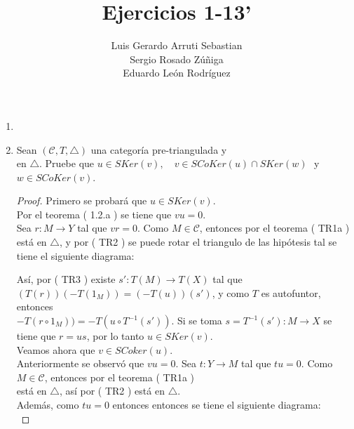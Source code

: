 \documentclass{article}
\title{Ejercicios 1-13'}
\author{Luis Gerardo Arruti Sebastian\\ Sergio Rosado Zúñiga\\ Eduardo Le\'on Rodr\'iguez}
\date{}
\begin{document}
	\maketitle
\begin{enumerate}

\item
\item Sean $(\mathscr{C},T,\triangle)$ una categoría pre-triangulada y  \\en $\triangle$.
Pruebe que $u\in SKer (v),\quad  v\in SCoKer(u)\cap SKer(w)$\,\, y \\ $w\in SCoKer(v)$.
\begin{proof}
Primero se probará que $u\in SKer (v)$. \\Por el teorema ( 1.2.a ) se tiene que $vu=0$.\\

Sea $r:M\to Y$ tal que $vr=0$. Como $M\in \mathscr{C}$, entonces por el teorema ( TR1a )  está en 
$\triangle$, y por ( TR2 ) se puede rotar el triangulo de las hipótesis tal se tiene el siguiente diagrama:\\

\centerline{
}

Así, por ( TR3 ) existe $s':T(M)\to T(X)$ tal que \\ $(T(r))(-T(1_M))=(-T(u))(s')$, y como $T$ es autofuntor, entonces \\
$-T(r\circ 1_M))=-T(u\circ T^{-1}(s'))$. Si se toma $s= T^{-1}(s'):M\to X$  se tiene que $r=us$, por lo tanto $u\in SKer(v)$.\\

Veamos ahora que $v\in SCoker(u)$.\\

Anteriormente se observó que $vu=0$. Sea $t:Y\to M$ tal que $tu=0$. Como $M\in \mathscr{C}$, entonces 
por el teorema ( TR1a )  \\está en $\triangle$, así por ( TR2 ) 
 está en $\triangle$.\\

Además, como $tu=0$ entonces entonces se tiene el siguiente diagrama:\\


\end{proof}
\end{enumerate}
\end{document}
